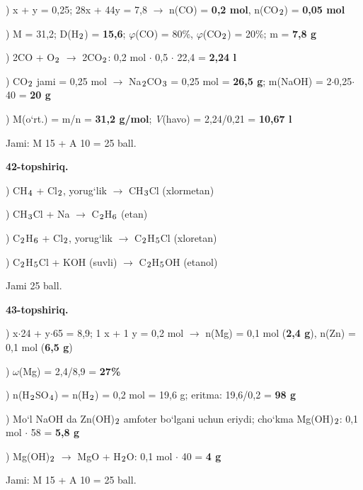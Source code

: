 \documentclass[11pt,a4paper]{article}
\renewcommand{\textsubscript}[1]{\ensuremath{_{\text{\fontsize{8}{8}\selectfont #1}}}}
\begin{document}
) x + y = 0,25; 28x + 44y = 7,8 $\to$ n(CO) = \textbf{0,2 mol}, n(CO\textsubscript{2}) = \textbf{0,05 mol}\par
{}) M = 31,2; D(H\textsubscript{2}) = \textbf{15,6}; $\varphi$(CO) = 80\%, $\varphi$(CO\textsubscript{2}) = 20\%; m = \textbf{7,8 g}\par
{}) 2CO + O\textsubscript{2} $\to$ 2CO\textsubscript{2}: 0,2 mol $\cdot$ 0,5 $\cdot$ 22,4 = \textbf{2,24 l}\par
{}) CO\textsubscript{2} jami = 0,25 mol $\to$ Na\textsubscript{2}CO\textsubscript{3} = 0,25 mol = \textbf{26,5 g}; m(NaOH) = 2$\cdot$0,25$\cdot$40 = \textbf{20 g}\par
{}) M(o`rt.) = m/n = \textbf{31,2 g/mol}; \textit{V}(havo) = 2,24/0,21 = \textbf{10,67 l}\par
\noindent Jami: M 15 + A 10 = 25 ball.\par
\noindent\textbf{42-topshiriq.}\par
{}) CH\textsubscript{4} + Cl\textsubscript{2}, yorug`lik $\to$ CH\textsubscript{3}Cl (xlormetan)\par
{}) CH\textsubscript{3}Cl + Na $\to$ C\textsubscript{2}H\textsubscript{6} (etan)\par
{}) C\textsubscript{2}H\textsubscript{6} + Cl\textsubscript{2}, yorug`lik $\to$ C\textsubscript{2}H\textsubscript{5}Cl (xloretan)\par
{}) C\textsubscript{2}H\textsubscript{5}Cl + KOH (suvli) $\to$ C\textsubscript{2}H\textsubscript{5}OH (etanol)\par
\noindent Jami 25 ball.\par
\noindent\textbf{43-topshiriq.}\par
{}) x$\cdot$24 + y$\cdot$65 = 8,9; 1 x + 1 y = 0,2 mol $\to$ n(Mg) = 0,1 mol (\textbf{2,4 g}), n(Zn) = 0,1 mol (\textbf{6,5 g})\par
{}) $\omega$(Mg) = 2,4/8,9 = \textbf{27\%}\par
{}) n(H\textsubscript{2}SO\textsubscript{4}) = n(H\textsubscript{2}) = 0,2 mol = 19,6 g; eritma: 19,6/0,2 = \textbf{98 g}\par
{}) Mo`l NaOH da Zn(OH)\textsubscript{2} amfoter bo`lgani uchun eriydi; cho`kma Mg(OH)\textsubscript{2}: 0,1 mol $\cdot$ 58 = \textbf{5,8 g}\par
{}) Mg(OH)\textsubscript{2} $\to$ MgO + H\textsubscript{2}O: 0,1 mol $\cdot$ 40 = \textbf{4 g}\par
\noindent Jami: M 15 + A 10 = 25 ball.\par
\end{document}
